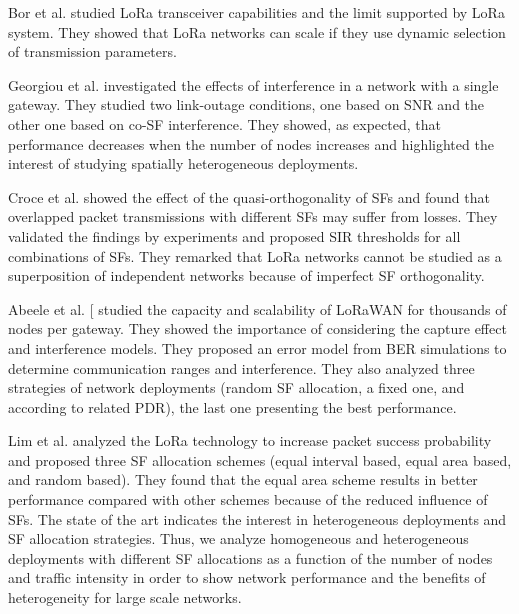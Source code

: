 Bor et al.
\cite{bor_lora_2016} studied LoRa transceiver capabilities and the limit supported by LoRa system.
They showed that LoRa networks can scale if they use dynamic selection of transmission parameters.

Georgiou et al.
\cite{georgiou_low_2017} investigated the effects of interference in a network with a single gateway.
They studied two link-outage conditions,
	one based on SNR and the other one based on co-SF interference.
They showed,
	as expected,
	that performance decreases when the number of nodes increases and highlighted the interest of studying spatially heterogeneous deployments.

Croce et al.
\cite{croce_impact_2018} showed the effect of the quasi-orthogonality of SFs and found that overlapped packet transmissions with different SFs may suffer from losses.
They validated the findings by experiments and proposed SIR thresholds for all combinations of SFs.
They remarked that LoRa networks cannot be studied as a superposition of independent networks because of imperfect SF orthogonality.

Abeele et al.
[\cite{abeele_scalability_2017} studied the capacity and scalability of LoRaWAN for thousands of nodes per gateway.
They showed the importance of considering the capture effect and interference models.
They proposed an error model from BER simulations to determine communication ranges and interference.
They also analyzed three strategies of network deployments (random SF allocation,
	a fixed one,
	and according to related PDR),
	the last one presenting the best performance.

Lim et al.
\cite{lim_spreading_2018} analyzed the LoRa technology to increase packet success probability and proposed three SF allocation schemes (equal interval based,
	equal area based,
	and random based).
They found that the equal area scheme results in better performance compared with other schemes because of the reduced influence of SFs.
The state of the art indicates the interest in heterogeneous deployments and SF allocation strategies.
Thus,
	we analyze homogeneous and heterogeneous deployments with different SF allocations as a function of the number of nodes and traffic intensity in order to show network performance and the benefits of heterogeneity for large scale networks.

